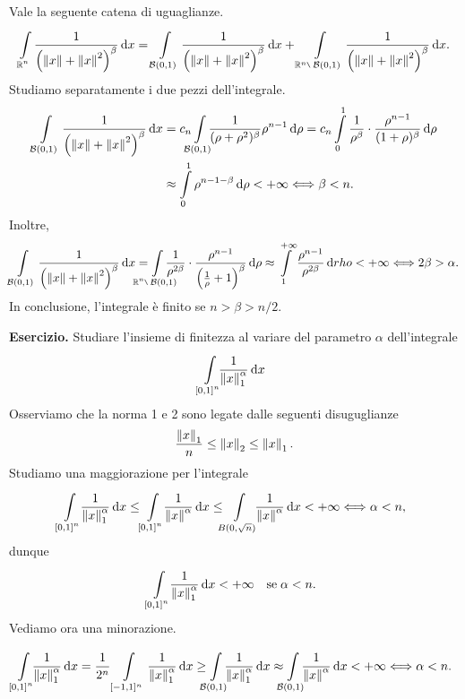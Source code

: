 \documentclass[a4paper, 12pt]{report}
\begin{document}
Vale la seguente catena di uguaglianze.
%
$$
\int\limits_{\mathclap{\R^n}}^{} \frac{1}{\left( \norm{ x } + \norm{ x }^2 \right)^\beta} \dd x 
= \int\limits_{\mathcal{B}(0,1)}^{} \frac{1}{\left( \norm{ x } + \norm{ x }^2 \right)^\beta} \dd x 
+ \int\limits_{\R^n \setminus \; \mathcal{B}(0,1)}^{} \frac{1}{\left( \norm{ x } + \norm{ x }^2 \right)^\beta} \dd x.
$$
%
Studiamo separatamente i due pezzi dell'integrale.
%
\begin{align*}
	\int\limits_{\mathcal{B}(0,1)}^{} \frac{1}{\left( \norm{ x } + \norm{ x }^2 \right)^\beta} \dd x 
	& = c_n \int\limits_{\mathclap{\mathcal{B}(0,1)}}^{} \frac{1}{(\rho + \rho^2)^\beta} \rho^{n-1} \dd \rho
	= c_n \int\limits_{\mathclap{0}}^{1} \frac{1}{\rho^\beta} \cdot \frac{\rho^{n-1}}{(1 + \rho)^\beta} \dd \rho \\
	& \approx \int\limits_{\mathclap{0}}^{1} \rho^{n-1-\beta} \dd \rho < + \infty \longiff  \beta < n.
\end{align*}
%
Inoltre,
%
$$
	\int\limits_{\mathcal{B}(0,1)}^{} \frac{1}{\left( \norm{ x } + \norm{ x }^2 \right)^\beta} \dd x 
	= \int\limits_{\mathclap{\R^n \setminus \; \mathcal{B}(0,1)}}^{} \frac{1}{\rho^{2\beta}} \cdot \frac{\rho^{n-1}}{\left( \frac{1}{\rho} + 1 \right)^\beta} \dd \rho 
	\approx \int\limits_{\mathclap{1}}^{+\infty} \frac{\rho^{n-1}}{\rho^{2\beta}} \dd rho < + \infty \longiff 2\beta > \alpha.  
$$
%
In conclusione, l'integrale è finito se $n > \beta > n / 2$.


\textbf{Esercizio.}
Studiare l'insieme di finitezza al variare del parametro $\alpha$ dell'integrale
$$
	\int\limits_{\mathclap{[0,1]^n}}^{} \frac{1}{\norm{ x }_1^\alpha} \dd x 
$$
Osserviamo che la norma 1 e 2 sono legate dalle seguenti disuguglianze
$$
	\frac{\left\lVert  x  \right\rVert_1}{n} \leq \left\lVert  x  \right\rVert_2 \leq \left\lVert  x  \right\rVert_1.
$$
%
Studiamo una maggiorazione per l'integrale
%
$$
	\int\limits_{\mathclap{[0,1]^n}}^{} \, \frac{1}{\norm{ x }_1^\alpha} \dd x 
	\leq \;\int\limits_{\mathclap{[0,1]^n}}^{} \, \frac{1}{\norm{ x }^\alpha} \dd x 
	\leq \;\;\int\limits_{\mathclap{B(0,\sqrt{n})}}^{}\;\; \frac{1}{\norm{ x }^\alpha} \dd x < + \infty \longiff \alpha < n,
$$
%
dunque
%
$$
\int\limits_{\mathclap{[0,1]^n}}^{} \, \frac{1}{\norm{ x }_1^\alpha} \dd x < +\infty \quad \text{se} \; \alpha < n.
$$
%
Vediamo ora una minorazione.

$$
	\int\limits_{\mathclap{[0,1]^n}}^{} \frac{1}{\norm{ x }_1^\alpha} \dd x 
= \frac{1}{2^n}	\int\limits_{[-1,1]^n}^{} \frac{1}{\norm{ x }_1^\alpha} \dd x 
\geq \int\limits_{\mathclap{\mathcal{B}(0,1)}}^{} \frac{1}{\norm{ x }_1^\alpha} \dd x 
\approx \int\limits_{\mathclap{\mathcal{B}(0,1)}}^{} \frac{1}{\norm{ x }^\alpha} \dd x < + \infty 
\longiff \alpha < n.
$$
\end{document}
